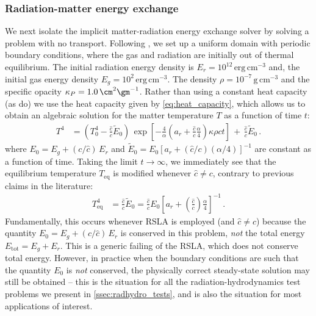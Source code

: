 \documentclass[fleqn,usenatbib]{mnras}
\begin{document}
\subsubsection{Radiation-matter energy exchange}
\label{section:equilibrium}
We next isolate the implicit matter-radiation energy exchange solver by solving a problem with no transport. Following \citet{Turner_2001}, we set up a uniform domain with periodic boundary conditions, where the gas and radiation are initially out of thermal equilibrium. The initial radiation energy density is $E_r = 10^{12} \, \text{erg} \, \text{cm}^{-3}$ and, the initial gas energy density $E_g = 10^2 \, \text{erg} \, \text{cm}^{-3}$. The density $\rho = 10^{-7} \, \text{g} \, \text{cm}^{-3}$ and the specific opacity $\kappa_P = 1.0 \, \cm^{2} \gm^{-1}$. Rather than using a constant heat capacity (as \citealt{Turner_2001} do) we use the heat capacity given by \autoref{eq:heat_capacity}, which allows us to obtain an algebraic solution for the matter temperature $T$ as a function of time $t$:
\begin{align}
T^4 &= \left( T_{0}^4 - \frac{\hat c}{c} \tilde E_0 \right) \, \exp \left[ -\frac{4}{\alpha} \left( a_r + \frac{\hat c}{c} \frac{\alpha}{4} \right) \kappa \rho c t \right] \, + \, \frac{\hat c}{c} \tilde E_0 \, .
\end{align}
where $E_0 = E_{g} + (c/\hat c) \, E_{r}$ and $\tilde E_0 = E_0 \left[ a_r + (\hat c / c) (\alpha / 4) \right]^{-1}$ are constant as a function of time. Taking the limit $t \rightarrow \infty$, we immediately see that the equilibrium temperature $T_{\text{eq}}$ is modified whenever $\hat c \neq c$, contrary to previous claims in the literature:
\begin{align}
T_{\text{eq}}^4 &= \frac{\hat c}{c} \tilde E_0 = \frac{\hat c}{c} E_0 \left[ a_r + \left(\frac{\hat c}{c} \right) \frac{\alpha}{4} \right]^{-1} \, .
\end{align}
Fundamentally, this occurs whenever RSLA is employed (and $\hat c \neq c$) because the quantity $E_0 = E_g + (c / \hat c) \, E_r$ is conserved in this problem, \emph{not} the total energy $E_{\text{tot}} = E_g + E_r$. This is a generic failing of the RSLA, which does not conserve total energy. However, in practice when the boundary conditions are such that the quantity $E_0$ is \emph{not} conserved, the physically correct steady-state solution may still be obtained -- this is the situation for all the radiation-hydrodynamics test problems we present in \autoref{ssec:radhydro_tests}, and is also the situation for most applications of interest.
\end{document}
